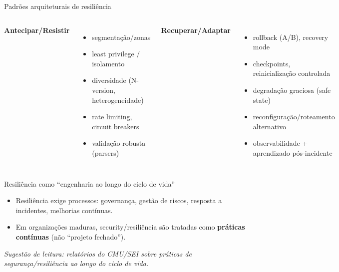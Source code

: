 \documentclass{beamer}
\begin{document}
\begin{frame}{Padrões arquiteturais de resiliência}
\begin{columns}[T,onlytextwidth]
\textbf{Antecipar/Resistir}
\begin{itemize}
  \item segmentação/zonas
  \item least privilege / isolamento
  \item diversidade (N-version, heterogeneidade)
  \item rate limiting, circuit breakers
  \item validação robusta (parsers)
\end{itemize}

\textbf{Recuperar/Adaptar}
\begin{itemize}
  \item rollback (A/B), recovery mode
  \item checkpoints, reinicialização controlada
  \item degradação graciosa (safe state)
  \item reconfiguração/roteamento alternativo
  \item observabilidade + aprendizado pós-incidente
\end{itemize}
\end{columns}

\end{frame}

\begin{frame}{Resiliência como “engenharia ao longo do ciclo de vida”}
\begin{itemize}
  \item Resiliência exige processos: governança, gestão de riscos, resposta a incidentes, melhorias contínuas.
  \item Em organizações maduras, security/resiliência são tratadas como \textbf{práticas contínuas} (não “projeto fechado”).
\end{itemize}

\small
\textit{Sugestão de leitura: relatórios do CMU/SEI sobre práticas de segurança/resiliência ao longo do ciclo de vida.}
\end{frame}

\end{document}
